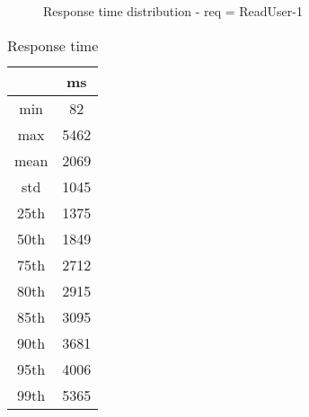 \begin{minipage}{0.75\linewidth}
\begin{figure}[h]
\begin{adjustbox}{max width=1.0\linewidth, keepaspectratio}
  \end{adjustbox}
  \caption{Response time distribution - req = ReadUser-1}
\end{figure}
\end{minipage}\hfill\begin{minipage}{0.18\linewidth}
\begin{table}[h]
\begin{tabular}{|cc|}
\hline
\textbf{} & \textbf{ms}\\ \hline
 \Xhline{0.005\arrayrulewidth}
min & 82\\
 \Xhline{0.005\arrayrulewidth}
max & 5462\\
 \Xhline{0.005\arrayrulewidth}
mean & 2069\\
 \Xhline{0.005\arrayrulewidth}
std & 1045\\
\hline
\hline
 \Xhline{0.005\arrayrulewidth}
25th & 1375\\
 \Xhline{0.005\arrayrulewidth}
50th & 1849\\
 \Xhline{0.005\arrayrulewidth}
75th & 2712\\
 \Xhline{0.005\arrayrulewidth}
80th & 2915\\
 \Xhline{0.005\arrayrulewidth}
85th & 3095\\
 \Xhline{0.005\arrayrulewidth}
90th & 3681\\
 \Xhline{0.005\arrayrulewidth}
95th & 4006\\
 \Xhline{0.005\arrayrulewidth}
99th & 5365\\
\hline
\end{tabular}
\caption{Response time}
\end{table}
\end{minipage}\hfill